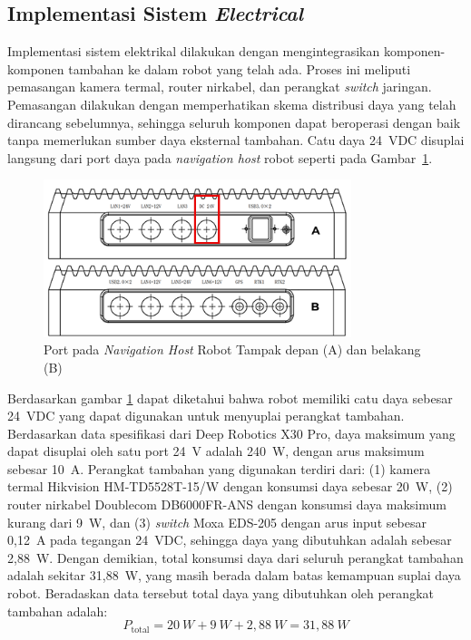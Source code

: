 \subsection{Implementasi Sistem \emph{Electrical}}
Implementasi sistem elektrikal dilakukan dengan mengintegrasikan komponen-komponen tambahan ke dalam robot yang telah ada. Proses ini meliputi pemasangan kamera termal, router nirkabel, dan perangkat \emph{switch} jaringan. Pemasangan dilakukan dengan memperhatikan skema distribusi daya yang telah dirancang sebelumnya, sehingga seluruh komponen dapat beroperasi dengan baik tanpa memerlukan sumber daya eksternal tambahan. Catu daya 24~VDC disuplai langsung dari port daya pada \emph{navigation host} robot seperti pada Gambar~\ref{fig:int-control-port}. 

\begin{figure}[H]
  \centering
  \includegraphics[width=0.8\textwidth]{gambar/bab3/int-control-port.png}
  \caption{Port pada \emph{Navigation Host} Robot  Tampak depan (A) dan belakang (B) \cite{deeprobotics_jueyingx30}}
  \label{fig:int-control-port}
\end{figure}

Berdasarkan gambar \ref{fig:int-control-port} dapat diketahui bahwa robot memiliki catu daya sebesar 24~VDC yang dapat digunakan untuk menyuplai perangkat tambahan. Berdasarkan data spesifikasi dari Deep Robotics X30 Pro, daya maksimum yang dapat disuplai oleh satu port 24~V adalah 240~W, dengan arus maksimum sebesar 10~A. Perangkat tambahan yang digunakan terdiri dari: (1) kamera termal Hikvision HM-TD5528T-15/W dengan konsumsi daya sebesar 20~W, (2) router nirkabel Doublecom DB6000FR-ANS dengan konsumsi daya maksimum kurang dari 9~W, dan (3) \emph{switch} Moxa EDS-205 dengan arus input sebesar 0{,}12~A pada tegangan 24~VDC, sehingga daya yang dibutuhkan adalah sebesar 2{,}88~W. Dengan demikian, total konsumsi daya dari seluruh perangkat tambahan adalah sekitar 31{,}88~W, yang masih berada dalam batas kemampuan suplai daya robot. Beradaskan data tersebut total daya yang dibutuhkan oleh perangkat tambahan adalah:
\[
P_{\text{total}} = 20~W + 9~W + 2{,}88~W = 31{,}88~W
\]

